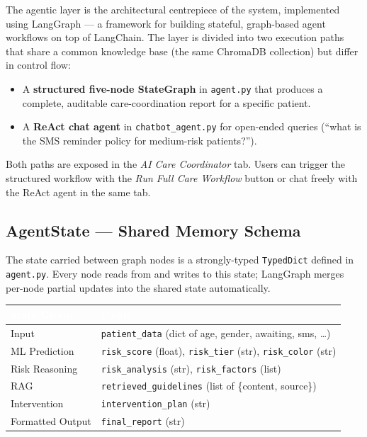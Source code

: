 \documentclass[11pt,a4paper]{article}
\newcommand{\hdrrow}[1]{\textcolor{white}{\textbf{#1}}}
\newcommand{\hdrline}{\rowcolor{navy}}
\begin{document}
The agentic layer is the architectural centrepiece of the system,
implemented using LangGraph --- a framework for building stateful,
graph-based agent workflows on top of LangChain. The layer is divided into
two execution paths that share a common knowledge base (the same
ChromaDB collection) but differ in control flow:

\begin{itemize}[leftmargin=1.2em]
\item A \textbf{structured five-node StateGraph} in \texttt{agent.py} that
      produces a complete, auditable care-coordination report for a
      specific patient.
\item A \textbf{ReAct chat agent} in \texttt{chatbot\_agent.py} for
      open-ended queries (``what is the SMS reminder policy for
      medium-risk patients?'').
\end{itemize}

Both paths are exposed in the \emph{AI Care Coordinator} tab. Users can
trigger the structured workflow with the \emph{Run Full Care Workflow}
button or chat freely with the ReAct agent in the same tab.

\subsection{AgentState --- Shared Memory Schema}

The state carried between graph nodes is a strongly-typed
\texttt{TypedDict} defined in \texttt{agent.py}. Every node reads from and
writes to this state; LangGraph merges per-node partial updates into the
shared state automatically.

\begin{tabularx}{\textwidth}{|>{\hsize=0.36\hsize}X|X|}
\hline
\hdrline \hdrrow{State Group} & \hdrrow{Fields} \\ \hline
Input                & \texttt{patient\_data} (dict of age, gender, awaiting, sms, \ldots) \\ \hline
ML Prediction        & \texttt{risk\_score} (float), \texttt{risk\_tier} (str), \texttt{risk\_color} (str) \\ \hline
Risk Reasoning       & \texttt{risk\_analysis} (str), \texttt{risk\_factors} (list) \\ \hline
RAG                  & \texttt{retrieved\_guidelines} (list of \{content, source\}) \\ \hline
Intervention         & \texttt{intervention\_plan} (str) \\ \hline
Formatted Output     & \texttt{final\_report} (str) \\ \hline
\end{tabularx}
\end{document}
